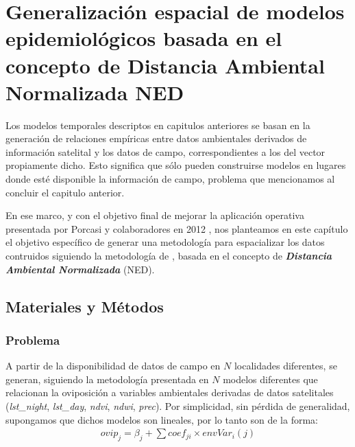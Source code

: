 



\justifying

\chapter{Generalización espacial de modelos epidemiológicos basada en el
        concepto de Distancia Ambiental Normalizada NED}

  \par Los modelos temporales descriptos en capitulos anteriores se basan en la
    generación de relaciones empíricas entre datos ambientales derivados de
    información satelital y los datos de campo, correspondientes a los del vector
    propiamente dicho. Esto significa que sólo pueden construirse modelos en
    lugares donde esté disponible la información de campo, problema que mencionamos
    al concluir el capitulo anterior.

  \par En ese marco, y con el objetivo final de mejorar la aplicación operativa
    presentada por Porcasi y colaboradores en 2012 \cite{porcasi_operative},
    nos planteamos en este capítulo el objetivo específico de generar
    una metodología para espacializar los datos contruidos siguiendo la
    metodología de \cite{german_temporal}, basada en el concepto de
    \textbf{\textit{Distancia Ambiental Normalizada}} (NED).


\section{Materiales y Métodos}

\subsection{Problema}

  \par A partir de la disponibilidad de datos de campo en $N$ localidades
    diferentes, se generan, siguiendo la metodología presentada en \cite{german_temporal}
    $N$ modelos diferentes que relacionan la oviposición a variables ambientales
    derivadas de datos satelitales (\textit{lst\_night}, \textit{lst\_day},
    \textit{ndvi}, \textit{ndwi}, \textit{prec}). Por simplicidad, sin pérdida
    de generalidad, supongamos que dichos modelos son lineales, por lo tanto
    son de la forma:
    \begin{align}
      ovip_{j} = \beta_{j} + \sum{}{coef_{ji} \times envVar_{i}(j)}
    \end{align}

